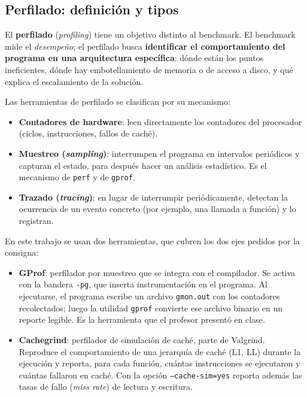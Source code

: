 \subsection{Perfilado: definición y tipos}

El \textbf{perfilado} (\textit{profiling}) tiene un objetivo distinto al benchmark. El benchmark mide el \emph{desempeño}; el perfilado busca \textbf{identificar el comportamiento del programa en una arquitectura específica}: dónde están los puntos ineficientes, dónde hay embotellamiento de memoria o de acceso a disco, y qué explica el escalamiento de la solución.

Las herramientas de perfilado se clasifican por su mecanismo:

\begin{itemize}
    \item \textbf{Contadores de hardware}: leen directamente los contadores del procesador (ciclos, instrucciones, fallos de caché).
    \item \textbf{Muestreo (\textit{sampling})}: interrumpen el programa en intervalos periódicos y capturan el estado, para después hacer un análisis estadístico. Es el mecanismo de \texttt{perf} y de \texttt{gprof}.
    \item \textbf{Trazado (\textit{tracing})}: en lugar de interrumpir periódicamente, detectan la ocurrencia de un evento concreto (por ejemplo, una llamada a función) y lo registran.
\end{itemize}

En este trabajo se usan dos herramientas, que cubren los dos ejes pedidos por la consigna:

\begin{itemize}
    \item \textbf{GProf}: perfilador por muestreo que se integra con el compilador. Se activa con la bandera \texttt{-pg}, que inserta instrumentación en el programa. Al ejecutarse, el programa escribe un archivo \texttt{gmon.out} con los contadores recolectados; luego la utilidad \texttt{gprof} convierte ese archivo binario en un reporte legible. Es la herramienta que el profesor presentó en clase.
    \item \textbf{Cachegrind}: perfilador de simulación de caché, parte de Valgrind. Reproduce el comportamiento de una jerarquía de caché (L1, LL) durante la ejecución y reporta, para cada función, cuántas instrucciones se ejecutaron y cuántas fallaron en caché. Con la opción \texttt{--cache-sim=yes} reporta además las tasas de fallo (\textit{miss rate}) de lectura y escritura.
\end{itemize}

